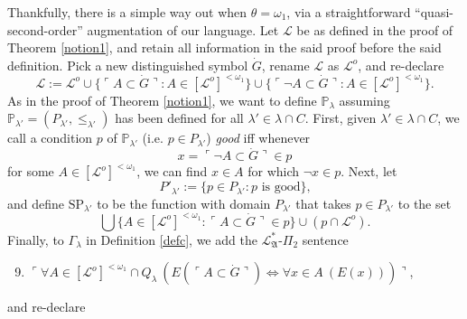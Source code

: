 \documentclass[12pt, twoside]{memoir}
\numberwithin{equation}{section}
\theoremstyle{definition}
\theoremstyle{remark}
\theoremstyle{definition}
\theoremstyle{definition}
\theoremstyle{definition}
\theoremstyle{remark}
\begin{document}
Thankfully, there is a simple way out when $\theta = \omega_1$, via a straightforward ``quasi-second-order'' augmentation of our language. Let $\mathcal{L}$ be as defined in the proof of Theorem \ref{notion1}, and retain all information in the said proof before the said definition. Pick a new distinguished symbol $\dot{G}$, rename $\mathcal{L}$ as $\mathcal{L}^o$, and re-declare
\begin{equation*}
    \mathcal{L} := \mathcal{L}^o \cup \{\ulcorner A \subset \dot{G} \urcorner : A \in [\mathcal{L}^o]^{< \omega_1}\} \cup \{\ulcorner \neg A \subset \dot{G} \urcorner : A \in [\mathcal{L}^o]^{< \omega_1}\} \text{.}
\end{equation*} 
As in the proof of Theorem \ref{notion1}, we want to define $\mathbb{P}_{\lambda}$ assuming $\mathbb{P}_{\lambda'} = (P_{\lambda'}, \leq_{\lambda'})$ has been defined for all $\lambda' \in \lambda \cap C$. First, given $\lambda' \in \lambda \cap C$, we call a condition $p$ of $\mathbb{P}_{\lambda'}$ (i.e. $p \in P_{\lambda'}$) \textit{good} iff whenever $$x = \ulcorner \neg A \subset \dot{G} \urcorner \in p$$ for some $A \in [\mathcal{L}^o]^{< \omega_1}$, we can find $x \in A$ for which $\neg x \in p$. Next, let 
\begin{equation*}
    P'_{\lambda'} := \{p \in P_{\lambda'} : p \text{ is good}\} \text{,}
\end{equation*}
and define $\mathrm{SP}_{\lambda'}$ to be the function with domain $P_{\lambda'}$ that takes $p \in P_{\lambda'}$ to the set
\begin{equation*}
    \bigcup \{A \in [\mathcal{L}^o]^{< \omega_1} : \ulcorner A \subset \dot{G} \urcorner \in p\} \cup (p \cap \mathcal{L}^o) \text{.}
\end{equation*}
Finally, to $\Gamma_{\lambda}$ in Definition \ref{defc}, we add the $\mathcal{L}^*_{\mathfrak{A}}$-$\Pi_2$ sentence 
\begin{enumerate}[label=(S\arabic*)$_{\lambda}$, leftmargin=40pt]
    \setcounter{enumi}{8}
    \item\label{s9n} $\ulcorner \forall A \in [\mathcal{L}^o]^{< \omega_1} \cap Q_{\lambda} \ (E(\ulcorner A \subset \dot{G} \urcorner) \iff \forall x \in A \ (E(x))) \urcorner$,
\end{enumerate}
and re-declare
\end{document}
